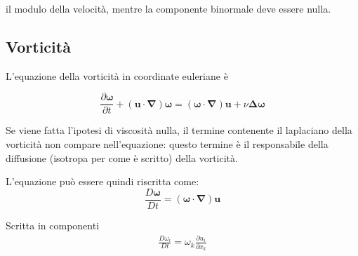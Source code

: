  il modulo della velocità, mentre la componente binormale deve essere nulla.



\subsection{Vorticità}
 
L'equazione della vorticità in coordinate euleriane è

\begin{equation}
 \frac{\partial \bm{\omega}}{\partial t}
   + (\bm{u}\cdot\bm{\nabla}) \bm{\omega} =
 (\bm{\omega}\cdot\bm{\nabla}) \bm{u} + \nu \bm{\Delta} \bm{\omega}
\end{equation}

Se viene fatta l'ipotesi di viscosità nulla, il termine contenente il 
 laplaciano della vorticità non compare nell'equazione: questo termine
 è il responsabile della diffusione (isotropa per come è scritto) della
 vorticità.
 
L'equazione può essere quindi riscritta come:
 \begin{equation}
  \frac{D\bm{\omega}}{Dt} = (\bm{\omega} \cdot \bm{\nabla}) \bm{u}
 \end{equation}

\noindent 
Scritta in componenti
\begin{equation}
\begin{aligned}
  \frac{D \omega_i}{D t} = \omega_k \frac{\partial u_i}{\partial x_k} \\
\end{aligned}
\end{equation}

